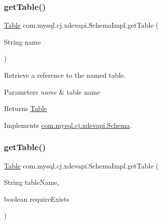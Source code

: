 \mbox{\label{classcom_1_1mysql_1_1cj_1_1xdevapi_1_1_schema_impl_a47c591b1796cbcb04985088ad3cbaad7}} 
\subsubsection{\texorpdfstring{get\+Table()}{getTable()}\hspace{0.1cm}{\footnotesize\ttfamily [1/2]}}
{\footnotesize\ttfamily \mbox{\hyperlink{interfacecom_1_1mysql_1_1cj_1_1xdevapi_1_1_table}{Table}} com.\+mysql.\+cj.\+xdevapi.\+Schema\+Impl.\+get\+Table (\begin{DoxyParamCaption}\item[{String}]{name }\end{DoxyParamCaption})}

Retrieve a reference to the named table.


\begin{DoxyParams}{Parameters}
{\em name} & table name \\
\hline
\end{DoxyParams}
\begin{DoxyReturn}{Returns}
\mbox{\hyperlink{interfacecom_1_1mysql_1_1cj_1_1xdevapi_1_1_table}{Table}} 
\end{DoxyReturn}


Implements \mbox{\hyperlink{interfacecom_1_1mysql_1_1cj_1_1xdevapi_1_1_schema_a27cf7ad5981483a0e44b6ea795b3e428}{com.\+mysql.\+cj.\+xdevapi.\+Schema}}.

\mbox{\label{classcom_1_1mysql_1_1cj_1_1xdevapi_1_1_schema_impl_a6bef049505f3d49b68e56fb2169dc165}} 
\subsubsection{\texorpdfstring{get\+Table()}{getTable()}\hspace{0.1cm}{\footnotesize\ttfamily [2/2]}}
{\footnotesize\ttfamily \mbox{\hyperlink{interfacecom_1_1mysql_1_1cj_1_1xdevapi_1_1_table}{Table}} com.\+mysql.\+cj.\+xdevapi.\+Schema\+Impl.\+get\+Table (\begin{DoxyParamCaption}\item[{String}]{table\+Name,  }\item[{boolean}]{require\+Exists }\end{DoxyParamCaption})}

